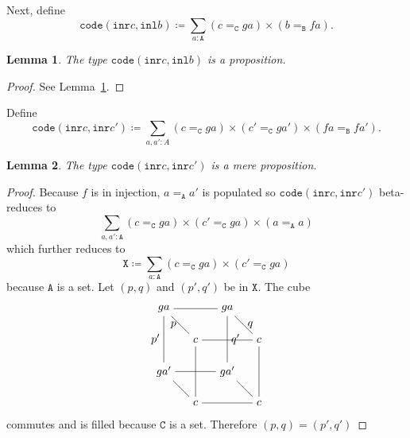 \message{ !name(notes.tex)}\documentclass[12pt]{amsart}
\newcommand{\bydef}{\coloneqq}
\newcommand{\type}[1]{\mathtt{#1}}
\newcommand{\tin}{\colon}
\newcommand{\A}{\type{A}}
\newcommand{\B}{\type{B}}
\newcommand{\C}{\type{C}}
\newcommand{\inl}{\type{inl}}
\newcommand{\inr}{\type{inr}}
\newcommand{\code}{\type{code}}
\newtheorem{lemma}{Lemma}
\theoremstyle{remark}
\theoremstyle{definition}
\begin{document}
Next, define
\[
  \code ( \inr c , \inl b ) \bydef
  \sum_{ a : \A } ( c =_\C ga ) \times ( b =_\B fa ).
\]

\begin{lemma} \label{thm:code-cb-isProp}
%
  The type \( \code ( \inr c , \inl b ) \) is a proposition.
%
\end{lemma}
\begin{proof}
%
  See Lemma~\ref{thm:code-cb-isProp}.   
%
\end{proof}

Define
\[
  \code ( \inr c , \inr c' ) \bydef \sum_{ a , a' : A }
  ( c =_\C ga ) \times ( c' =_\C ga' ) \times ( fa =_\B fa' ).
\]

\begin{lemma} \label{sec:code-cc-isProp}
%
  The type \( \code ( \inr c , \inr c' ) \) is a mere proposition.
%
\end{lemma}
\begin{proof}
%
  Because \( f \) is in injection, \( a =_\A a' \) is populated so
  \(
      \code ( \inr c , \inr c' )
  \)
   beta-reduces to
  \[
    \sum\limits_{a,a' \tin \A}
    ( c =_\C ga ) \times ( c' =_\C ga ) \times ( a =_\A a )
  \]
  which further reduces to 
  \[
    \type{X} \bydef
    \sum\limits_{a \tin \A} ( c =_\C ga ) \times ( c' =_\C ga )
  \]
  because \( \A \) is a set. Let \( (p,q) \) and \( ( p',q' ) \) be in
  \( \type{X} \). The cube
  \[
      \begin{tikzpicture}
        \node (1) at (0,2) {\( ga \)};
        \node (2) at (2,2) {\( ga\)};
        \node (3) at (1,1) {\( c \)};
        \node (4) at (3,1) {\( c \)};
        \node (5) at (0,0) {\( ga' \)};
        \node (6) at (2,0) {\( ga' \)};
        \node (7) at (1,-1) {\( c \)};
        \node (8) at (3,-1) {\( c \)};
        \draw [-] (1) to node [] {} (2);
        \draw [-] (3) to node [] {} (4);
        \draw [-] (5) to node [] {} (6);
        \draw [-] (7) to node [] {} (8);
        \draw [-] (1) to node [left] {\( p \)} (3);
        \draw [-] (2) to node [right] {\( q \)} (4);
        \draw [-] (5) to node [] {} (7);
        \draw [-] (6) to node [] {} (8);
        \draw [-] (1) to node [left] {\( p' \)} (5);
        \draw [-] (2) to node [right] {\( q' \)} (6);
        \draw [-] (3) to node [] {} (7);
        \draw [-] (4) to node [] {} (8); 
      \end{tikzpicture}
    \]
    commutes and is filled because \( \C \) is a set. Therefore
    \(
         ( p,q ) = ( p',q' ) 
    \)
%
\end{proof}
\end{document}
